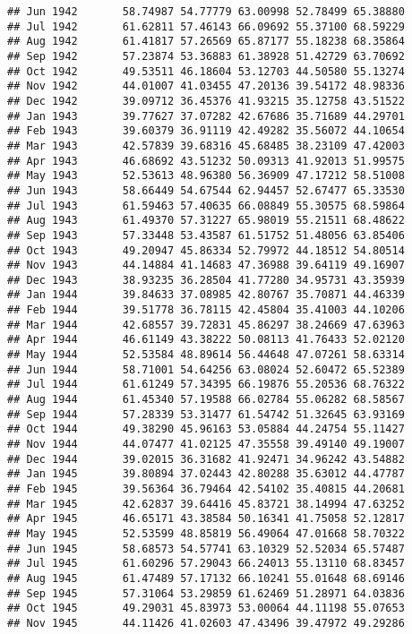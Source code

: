 \documentclass[
]{article}
\begin{document}
\begin{verbatim}
## Jun 1942       58.74987 54.77779 63.00998 52.78499 65.38880
## Jul 1942       61.62811 57.46143 66.09692 55.37100 68.59229
## Aug 1942       61.41817 57.26569 65.87177 55.18238 68.35864
## Sep 1942       57.23874 53.36883 61.38928 51.42729 63.70692
## Oct 1942       49.53511 46.18604 53.12703 44.50580 55.13274
## Nov 1942       44.01007 41.03455 47.20136 39.54172 48.98336
## Dec 1942       39.09712 36.45376 41.93215 35.12758 43.51522
## Jan 1943       39.77627 37.07282 42.67686 35.71689 44.29701
## Feb 1943       39.60379 36.91119 42.49282 35.56072 44.10654
## Mar 1943       42.57839 39.68316 45.68485 38.23109 47.42003
## Apr 1943       46.68692 43.51232 50.09313 41.92013 51.99575
## May 1943       52.53613 48.96380 56.36909 47.17212 58.51008
## Jun 1943       58.66449 54.67544 62.94457 52.67477 65.33530
## Jul 1943       61.59463 57.40635 66.08849 55.30575 68.59864
## Aug 1943       61.49370 57.31227 65.98019 55.21511 68.48622
## Sep 1943       57.33448 53.43587 61.51752 51.48056 63.85406
## Oct 1943       49.20947 45.86334 52.79972 44.18512 54.80514
## Nov 1943       44.14884 41.14683 47.36988 39.64119 49.16907
## Dec 1943       38.93235 36.28504 41.77280 34.95731 43.35939
## Jan 1944       39.84633 37.08985 42.80767 35.70871 44.46339
## Feb 1944       39.51778 36.78115 42.45804 35.41003 44.10206
## Mar 1944       42.68557 39.72831 45.86297 38.24669 47.63963
## Apr 1944       46.61149 43.38222 50.08113 41.76433 52.02120
## May 1944       52.53584 48.89614 56.44648 47.07261 58.63314
## Jun 1944       58.71001 54.64256 63.08024 52.60472 65.52389
## Jul 1944       61.61249 57.34395 66.19876 55.20536 68.76322
## Aug 1944       61.45340 57.19588 66.02784 55.06282 68.58567
## Sep 1944       57.28339 53.31477 61.54742 51.32645 63.93169
## Oct 1944       49.38290 45.96163 53.05884 44.24754 55.11427
## Nov 1944       44.07477 41.02125 47.35558 39.49140 49.19007
## Dec 1944       39.02015 36.31682 41.92471 34.96242 43.54882
## Jan 1945       39.80894 37.02443 42.80288 35.63012 44.47787
## Feb 1945       39.56364 36.79464 42.54102 35.40815 44.20681
## Mar 1945       42.62837 39.64416 45.83721 38.14994 47.63252
## Apr 1945       46.65171 43.38584 50.16341 41.75058 52.12817
## May 1945       52.53599 48.85819 56.49064 47.01668 58.70322
## Jun 1945       58.68573 54.57741 63.10329 52.52034 65.57487
## Jul 1945       61.60296 57.29043 66.24013 55.13110 68.83457
## Aug 1945       61.47489 57.17132 66.10241 55.01648 68.69146
## Sep 1945       57.31064 53.29859 61.62469 51.28971 64.03836
## Oct 1945       49.29031 45.83973 53.00064 44.11198 55.07653
## Nov 1945       44.11426 41.02603 47.43496 39.47972 49.29286

\end{verbatim}
\end{document}
